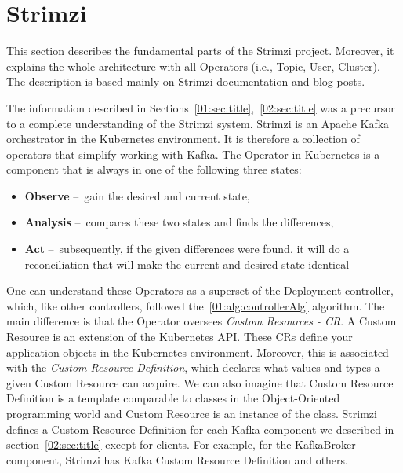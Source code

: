 \section{Strimzi}
\label{03:title}

This section describes the fundamental parts of the Strimzi project.
Moreover, it explains the whole architecture with all Operators (i.e., Topic, User, Cluster).
The description is based mainly on Strimzi documentation and blog posts\cite{strimziDoc, strimziBlogPosts}.

The information described in Sections~\ref{01:sec:title},~\ref{02:sec:title} was a precursor to a complete understanding of the Strimzi system.
Strimzi is an Apache Kafka orchestrator in the Kubernetes environment.
It is therefore a collection of operators that simplify working with Kafka.
The Operator in Kubernetes is a component that is always in one of the following three states:
\begin{itemize}[itemsep=1mm, parsep=0pt]
    \item \textbf{Observe} \---\ gain the desired and current state,
    \item \textbf{Analysis} \---\ compares these two states and finds the differences,
    \item \textbf{Act} \---\ subsequently, if the given differences were found, it will do a reconciliation that will make the current and desired state identical
\end{itemize}

One can understand these Operators as a superset of the Deployment controller, which, like other controllers, followed the~\ref{01:alg:controllerAlg} algorithm.
The main difference is that the Operator oversees \emph{Custom Resources - CR}.
A Custom Resource is an extension of the Kubernetes API. These CRs define your application objects in the Kubernetes environment.
Moreover, this is associated with the \emph{Custom Resource Definition}, which declares what values and types a given Custom Resource can acquire.
We can also imagine that Custom Resource Definition is a template comparable to classes in the Object-Oriented programming world and Custom Resource is an instance of the class.
Strimzi defines a Custom Resource Definition for each Kafka component we described in section~\ref{02:sec:title} except for clients.
For example, for the KafkaBroker component, Strimzi has Kafka Custom Resource Definition and others.

